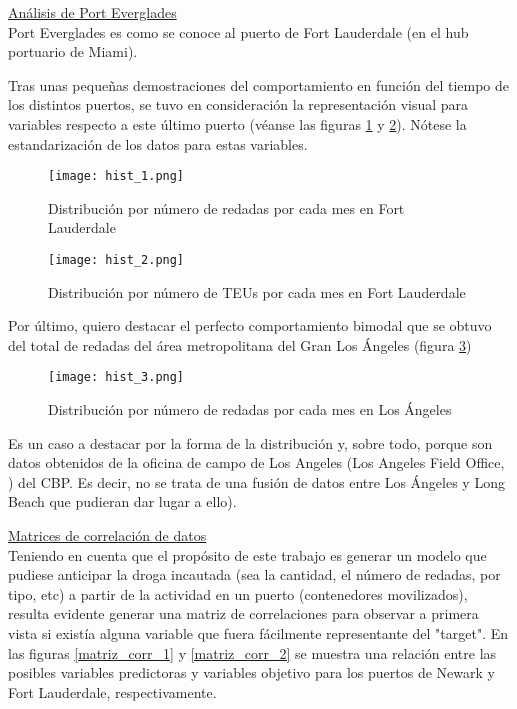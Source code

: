 \documentclass[12pt]{article}
\begin{document}
		\underline{Análisis de Port Everglades}\\
		Port Everglades es como se conoce al puerto de Fort Lauderdale (en el hub portuario de Miami).
		
		Tras unas pequeñas demostraciones del comportamiento en función del tiempo de los distintos puertos, se tuvo en consideración la representación visual para variables respecto a este último puerto (véanse las figuras \ref{hist_1} y \ref{hist_2}). Nótese la estandarización de los datos para estas variables.
		
		\begin{figure}[H]
			\caption{\label{hist_1} Distribución por número de redadas por cada mes en Fort Lauderdale}
			\centering
			\hspace*{1cm}
			\texttt{[image: hist\_1.png]}
		\end{figure}
	
		\begin{figure}[H]
			\caption{\label{hist_2} Distribución por número de TEUs por cada mes en Fort Lauderdale}
			\centering
			\hspace*{1cm}
			\texttt{[image: hist\_2.png]}
		\end{figure}
	
		Por último, quiero destacar el perfecto comportamiento bimodal que se obtuvo del total de redadas del área metropolitana del Gran Los Ángeles (figura  \ref{hist_3})
		
		\begin{figure}[H]
			\caption{\label{hist_3} Distribución por número de redadas por cada mes en Los Ángeles}
			\centering
			\hspace*{1cm}
			\texttt{[image: hist\_3.png]}
		\end{figure}
	
		Es un caso a destacar por la forma de la distribución y, sobre todo, porque son datos obtenidos de la oficina de campo de Los Angeles (Los Angeles Field Office, \cite{cbp_la_field_office}) del CBP. Es decir, no se trata de una fusión de datos entre Los Ángeles y Long Beach que pudieran dar lugar a ello).
		
		
		\underline{Matrices de correlación de datos}\\
		Teniendo en cuenta que el propósito de este trabajo es generar un modelo que pudiese anticipar la droga incautada (sea la cantidad, el número de redadas, por tipo, etc) a partir de la actividad en un puerto (contenedores movilizados), resulta evidente generar una matriz de correlaciones para observar a primera vista si existía alguna variable que fuera fácilmente representante del "target". En las figuras \ref{matriz_corr_1} y \ref{matriz_corr_2} se muestra una relación entre las posibles variables predictoras y variables objetivo para los puertos de Newark y Fort Lauderdale, respectivamente.
		
\end{document}
